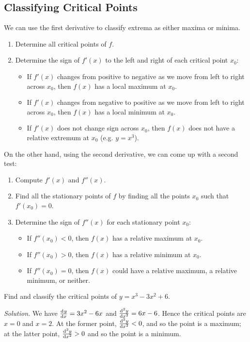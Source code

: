 \subsection*{Classifying Critical Points}
We can use the first derivative to classify extrema as either maxima or minima.
\begin{enumerate}
  \item Determine all critical points of $ f $.
  \item Determine the sign of $ f'(x) $ to the left and right of each critical point $ x_0 $:
    \begin{itemize}
      \item If $ f'(x) $ changes from positive to negative as we move from left to right across $ x_0 $, then $ f(x) $ has a local maximum at $ x_0 $.
      \item If $ f'(x) $ changes from negative to positive as we move from left to right across $ x_0 $, then $ f(x) $ has a local minimum at $ x_0 $.
      \item If $ f'(x) $ does not change sign across $ x_0 $, then $ f(x) $ does not have a relative extremum at $ x_0 $ (e.g. $ y = x^3 $).
    \end{itemize}
\end{enumerate}

On the other hand, using the second derivative, we can come up with a second test:
\begin{enumerate}
  \item Compute $ f'(x) $ and $ f''(x) $.
  \item Find all the stationary points of $ f $ by finding all the points $ x_0 $ such that $ f'(x_0) = 0 $.
  \item Determine the sign of $ f''(x) $ for each stationary point $ x_0 $:
    \begin{itemize}
      \item If $ f''(x_0) < 0 $, then $ f(x) $ has a relative maximum at $ x_0 $.
      \item If $ f''(x_0) > 0 $, then $ f(x) $ has a relative minimum at $ x_0 $.
      \item If $ f''(x_0) = 0 $, then $ f(x) $ could have a relative maximum, a relative minimum, or neither.
    \end{itemize}
\end{enumerate}

\begin{ex}
  Find and classify the critical points of $ y = x^3 - 3x^2 + 6 $.

  \textit{Solution.} We have $ \od{y}{x} = 3x^2 - 6x $ and $ \od[2]{y}{x} = 6x - 6 $. Hence
                     the critical points are $ x = 0 $ and $ x = 2 $. At the former point, $ \od[2]{y}{x} < 0 $,
                     and so the point is a maximum; at the latter point, $ \od[2]{y}{x} > 0 $ and so the point is
                     a minimum.
\end{ex}

